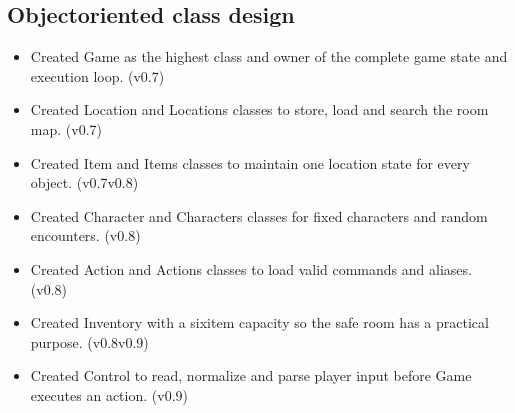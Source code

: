 \documentclass[letterpaper,10pt,english]{sphinxmanual}
\begin{document}
\subsection{Object\sphinxhyphen{}oriented class design}
\label{\detokenize{AssignmentFour/main:object-oriented-class-design}}\begin{itemize}
\item {} 
\sphinxAtStartPar
Created Game as the highest class and owner of the complete game state and execution loop. (v0.7)

\item {} 
\sphinxAtStartPar
Created Location and Locations classes to store, load and search the room map. (v0.7)

\item {} 
\sphinxAtStartPar
Created Item and Items classes to maintain one location state for every object. (v0.7\sphinxhyphen{}v0.8)

\item {} 
\sphinxAtStartPar
Created Character and Characters classes for fixed characters and random encounters. (v0.8)

\item {} 
\sphinxAtStartPar
Created Action and Actions classes to load valid commands and aliases. (v0.8)

\item {} 
\sphinxAtStartPar
Created Inventory with a six\sphinxhyphen{}item capacity so the safe room has a practical purpose. (v0.8\sphinxhyphen{}v0.9)

\item {} 
\sphinxAtStartPar
Created Control to read, normalize and parse player input before Game executes an action. (v0.9)

\end{itemize}
\end{document}
